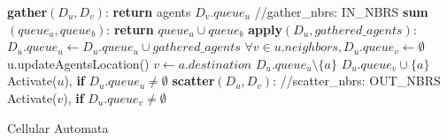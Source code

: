 \documentclass{article}
\begin{document}
	
	
	\begin{algorithm}
	\begin{algorithmic}[1]
	\STATE \textbf{gather}$(D_u, D_v)$: \textbf{return} agents $D_v.queue_u$ //gather\_nbrs: IN\_NBRS
	\newline
	\STATE \textbf{sum}$(queue_a, queue_b)$: \textbf{return} $queue_a \cup queue_b$
	\newline
	\STATE \textbf{apply}$(D_u, gathered\_agents)$:
	\STATE $D_u.queue_u \leftarrow D_u.queue_u \cup gathered\_agents$
	\STATE $\forall v \in u.neighbors, D_u.queue_v \leftarrow \emptyset $
	\STATE u.updateAgentsLocation()
			\STATE $v \leftarrow a.destination$
			\STATE $D_u.queue_u \setminus \{a\}$
			\STATE $D_u.queue_v \cup \{a\}$
		\ENDIF
	\ENDFOR
	\STATE 	Activate($u$), \textbf{if} $D_u.queue_u \neq \emptyset$
	\newline	
	\STATE \textbf{scatter}$(D_u, D_v)$: //scatter\_nbrs: OUT\_NBRS
	\STATE 	Activate($v$), \textbf{if} $D_u.queue_v \neq \emptyset$

	\end{algorithmic}
	\caption{Cellular Automata}	
	\end{algorithm}
	
\end{document}
